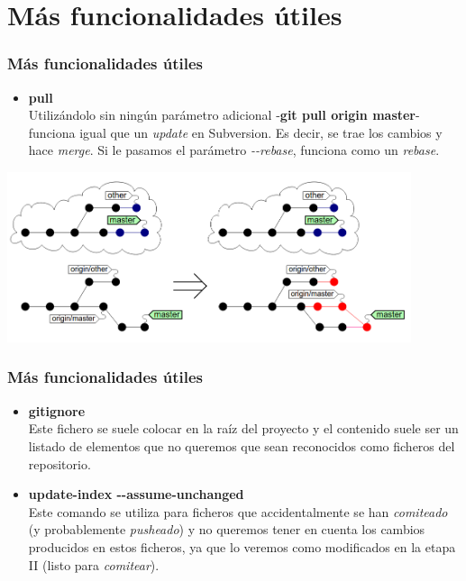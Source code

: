 \section{Más funcionalidades útiles}
\frame
{
\frametitle{Más funcionalidades útiles}
\begin{itemize}
 \item \textbf{pull}\\ \indent
Utilizándolo sin ningún parámetro adicional -\textbf{git pull origin master}- funciona igual que un \textit{update} en Subversion. Es decir, se trae los cambios y hace \textit{merge}. Si le pasamos el parámetro \textit{-{}-rebase}, funciona como un \textit{rebase}.
\end{itemize}

\includegraphics[height=5cm]{imgs/pull.png} 
}

\frame
{
\frametitle{Más funcionalidades útiles}
\begin{itemize}
 \item \textbf{gitignore}\\ \indent
Este fichero se suele colocar en la raíz del proyecto y el contenido suele ser un listado de elementos que no queremos que sean reconocidos como ficheros del repositorio. 
 \item \textbf{update-index -{}-assume-unchanged}\\ \indent
Este comando se utiliza para ficheros que accidentalmente se han \textit{comiteado} (y probablemente \textit{pusheado}) y no queremos tener en cuenta los cambios producidos en estos ficheros, ya que lo veremos como modificados en la etapa II (listo para \textit{comitear}).
\end{itemize}
}

